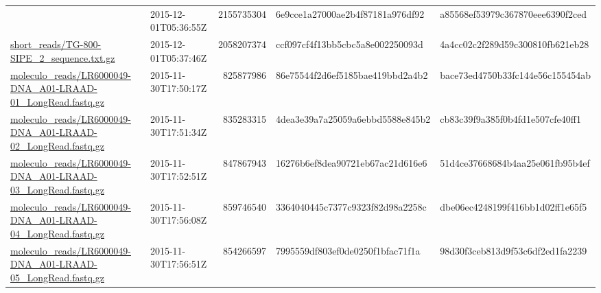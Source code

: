 \documentclass[12pt,a4paper]{scrartcl}
\begin{document}
\begin{table}
\begin{tabularx}{\linewidth}{>{\ttfamily\tiny}X>{\ttfamily\tiny}l>{\ttfamily\tiny}r*{2}{>{\ttfamily\tiny}l}}
                                                               & 2015-12-01T05:36:55Z &  \num{2155735304} & 6e9cce1a27000ae2b4f87181a976df92 & a85568ef53979c367870eee6390f2ced \\
\href{http://weatherby.genetics.utah.edu/seq_transf/short_reads/TG-800-SIPE_2_sequence.txt.gz}{short\_reads/TG-800-SIPE\_2\_sequence.txt.gz}
                                                               & 2015-12-01T05:37:46Z &  \num{2058207374} & ccf097cf4f13bb5cbc5a8e002250093d & 4a4cc02c2f289d59c300810fb621eb28 \\
\href{http://weatherby.genetics.utah.edu/seq_transf/moleculo_reads/LR6000049-DNA_A01-LRAAD-01_LongRead.fastq.gz}{moleculo\_reads/LR6000049-DNA\_A01-LRAAD-01\_LongRead.fastq.gz}
                                                               & 2015-11-30T17:50:17Z &   \num{825877986} & 86e75544f2d6ef5185bae419bbd2a4b2 & bace73ed4750b33fc144e56c155454ab \\
\href{http://weatherby.genetics.utah.edu/seq_transf/moleculo_reads/LR6000049-DNA_A01-LRAAD-02_LongRead.fastq.gz}{moleculo\_reads/LR6000049-DNA\_A01-LRAAD-02\_LongRead.fastq.gz}
                                                               & 2015-11-30T17:51:34Z &   \num{835283315} & 4dea3e39a7a25059a6ebbd5588e845b2 & cb83c39f9a385f0b4fd1e507cfe40ff1 \\
\href{http://weatherby.genetics.utah.edu/seq_transf/moleculo_reads/LR6000049-DNA_A01-LRAAD-03_LongRead.fastq.gz}{moleculo\_reads/LR6000049-DNA\_A01-LRAAD-03\_LongRead.fastq.gz}
                                                               & 2015-11-30T17:52:51Z &   \num{847867943} & 16276b6ef8dea90721eb67ac21d616e6 & 51d4ce37668684b4aa25e061fb95b4ef \\
\href{http://weatherby.genetics.utah.edu/seq_transf/moleculo_reads/LR6000049-DNA_A01-LRAAD-04_LongRead.fastq.gz}{moleculo\_reads/LR6000049-DNA\_A01-LRAAD-04\_LongRead.fastq.gz}
                                                               & 2015-11-30T17:56:08Z &   \num{859746540} & 3364040445c7377c9323f82d98a2258c & dbe06ec4248199f416bb1d02ff1e65f5 \\
\href{http://weatherby.genetics.utah.edu/seq_transf/moleculo_reads/LR6000049-DNA_A01-LRAAD-05_LongRead.fastq.gz}{moleculo\_reads/LR6000049-DNA\_A01-LRAAD-05\_LongRead.fastq.gz}
                                                               & 2015-11-30T17:56:51Z &   \num{854266597} & 7995559df803ef0de0250f1bfac71f1a & 98d30f3ceb813d9f53c6df2ed1fa2239 \\
\end{tabularx}
\end{table}
\end{document}
